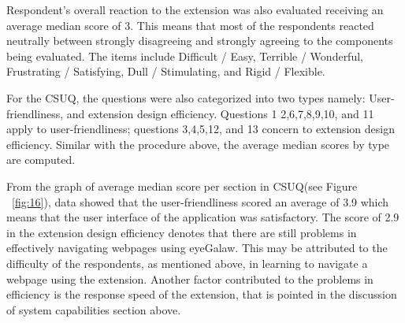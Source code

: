 \documentclass[journal]{./IEEE/IEEEtran}
\begin{document}
Respondent’s overall reaction to the extension was also evaluated receiving an average median  score of 3. This means that most of the respondents reacted neutrally between strongly disagreeing and strongly  agreeing to the components being evaluated. The items include Difficult / Easy, Terrible / Wonderful, Frustrating / Satisfying,  Dull / Stimulating, and Rigid / Flexible. 

For the CSUQ, the questions were also categorized into two types namely: User-friendliness, and extension design efficiency. Questions 1 2,6,7,8,9,10, and 11 apply to user-friendliness; questions 3,4,5,12, and 13 concern to extension design efficiency. Similar with the procedure above, the average median scores by type are computed.

From the graph of average median score per section in CSUQ(see Figure ~\ref{fig:16}), data showed that the user-friendliness scored an average of 3.9 which means that the user interface of the application was satisfactory. The score of 2.9 in the extension design efficiency denotes that there are still problems in effectively navigating webpages using eyeGalaw. 
This may be attributed to the  difficulty of the respondents, as mentioned above, in learning to navigate a webpage using the extension. Another factor contributed to the problems in efficiency is the response speed of the extension, that is pointed in the discussion of system capabilities section above. 
\end{document}
